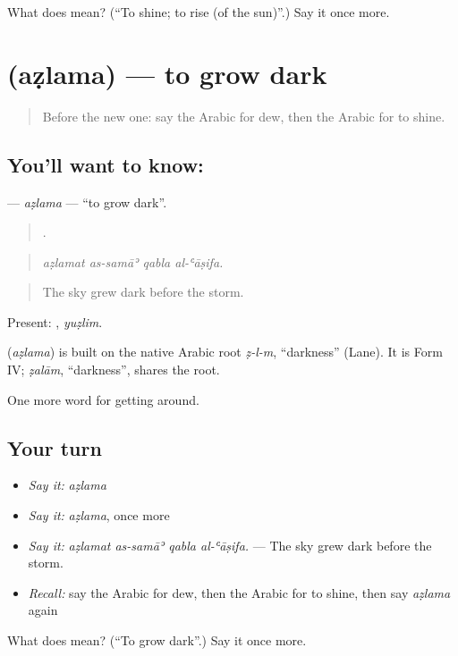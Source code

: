 \begin{tcolorbox}[breakable,colback=teal!4,colframe=teal!35!black,title={Before you move on}]
What does  mean? (\textquotedblleft{}To shine; to rise (of the sun)\textquotedblright{}.) Say it once more.
\end{tcolorbox}
\section[\texorpdfstring{\ar{أظلم} (aẓlama)}{أظلم (aẓlama)}]{ (aẓlama) — to grow dark}

\label{lesson:AR-C485-azlama}



\begin{quote}
Before the new one: say the Arabic for dew, then the Arabic for to shine.
\end{quote}

\subsection*{You'll want to know: }
\textbf{} — \emph{aẓlama} — \textquotedblleft{}to grow dark\textquotedblright{}.

\begin{quote}
   .
\end{quote}

\begin{quote}
\emph{aẓlamat as-samāʾ qabla al-ʿāṣifa.}
\end{quote}

\begin{quote}
The sky grew dark before the storm.
\end{quote}

Present: , \emph{yuẓlim}.

\begin{cousinweb}
\textbf{} (\emph{aẓlama}) is built on the native Arabic root \emph{ẓ-l-m}, \textquotedblleft{}darkness\textquotedblright{} (Lane). It is Form IV; \emph{ẓalām}, \textquotedblleft{}darkness\textquotedblright{}, shares the root.
\end{cousinweb}

\begin{grammarlens}[title={What you've built}]
One more word for getting around.
\end{grammarlens}

\subsection*{Your turn}
\begin{itemize}
\raggedright
  \item \emph{Say it:} \emph{aẓlama}
  \item \emph{Say it:} \emph{aẓlama}, once more
  \item \emph{Say it:} \emph{aẓlamat as-samāʾ qabla al-ʿāṣifa.} — The sky grew dark before the storm.
  \item \emph{Recall:} say the Arabic for dew, then the Arabic for to shine, then say \emph{aẓlama} again
\end{itemize}

\begin{tcolorbox}[breakable,colback=teal!4,colframe=teal!35!black,title={Before you move on}]
What does  mean? (\textquotedblleft{}To grow dark\textquotedblright{}.) Say it once more.
\end{tcolorbox}
